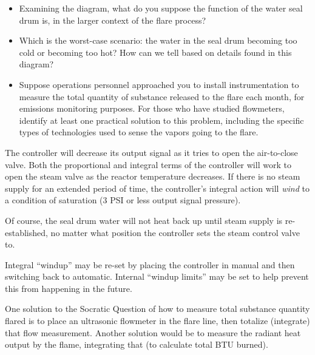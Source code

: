 \begin{itemize}
\item{} Examining the diagram, what do you suppose the function of the water seal drum is, in the larger context of the flare process?
\item{} Which is the worst-case scenario: the water in the seal drum becoming too cold or becoming too hot?  How can we tell based on details found in this diagram?
\item{} Suppose operations personnel approached you to install instrumentation to measure the total quantity of substance released to the flare each month, for emissions monitoring purposes.  For those who have studied flowmeters, identify at least one practical solution to this problem, including the specific types of technologies used to sense the vapors going to the flare.
\end{itemize}







The controller will decrease its output signal as it tries to open the air-to-close valve.  Both the proportional and integral terms of the controller will work to open the steam valve as the reactor temperature decreases.  If there is no steam supply for an extended period of time, the controller's integral action will {\it wind} to a condition of saturation (3 PSI or less output signal pressure).







Of course, the seal drum water will not heat back up until steam supply is re-established, no matter what position the controller sets the steam control valve to.

Integral ``windup'' may be re-set by placing the controller in manual and then switching back to automatic.  Internal ``windup limits'' may be set to help prevent this from happening in the future.

\vskip 10pt

One solution to the Socratic Question of how to measure total substance quantity flared is to place an ultrasonic flowmeter in the flare line, then totalize (integrate) that flow measurement.  Another solution would be to measure the radiant heat output by the flame, integrating that (to calculate total BTU burned).











